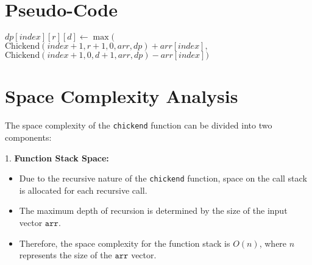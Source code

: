 \documentclass[8pt]{article}
\begin{document}
\vspace{-0.6em}
\section{Pseudo-Code}

\begin{algorithmic}[1]
\State {}
\Else
{}
\State {}
\EndIf
{}
\State {}
\EndIf
{}
\State {}
\EndIf
\State $\textit{dp}[\textit{index}][\textit{r}][\textit{d}] \gets \max($
\State \hspace{\algorithmicindent} $\text{Chickend}(\textit{index} + 1, \textit{r} + 1, 0, \textit{arr}, \textit{dp}) + \textit{arr}[\textit{index}],$
\State \hspace{\algorithmicindent} $\text{Chickend}(\textit{index} + 1, 0, \textit{d} + 1, \textit{arr}, \textit{dp}) - \textit{arr}[\textit{index}])$
\State {}
\EndIf
\EndFunction
\end{algorithmic}

\section{Space Complexity Analysis}

The space complexity of the \texttt{chickend} function can be divided into two components:

1. \textbf{Function Stack Space:}
   \begin{itemize}
       \item Due to the recursive nature of the \texttt{chickend} function, space on the call stack is allocated for each recursive call.
       \item The maximum depth of recursion is determined by the size of the input vector $\texttt{arr}$.
       \item Therefore, the space complexity for the function stack is \textbf{$O(n)$}, where $n$ represents the size of the $\texttt{arr}$ vector.
   \end{itemize}
\end{document}
